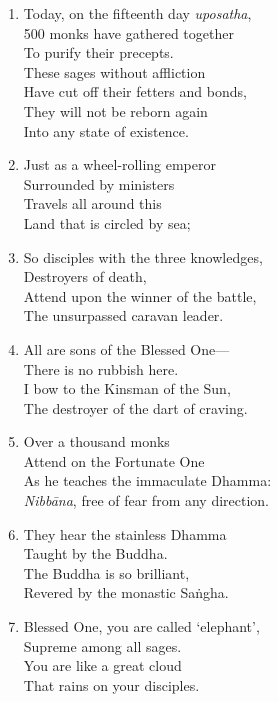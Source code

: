 \documentclass[10pt, openany]{book}
\newcommand*{\vleftofline}[1]{\leavevmode\llap{#1}}
\begin{document}
\begin{enumerate}
\item \vleftofline{“}Today, on the fifteenth day \emph{uposatha},\\
500 monks have gathered together \\
To purify their precepts.\\
These sages without affliction \\
Have cut off their fetters and bonds,\\
They will not be reborn again \\
Into any state of existence.

\item Just as a wheel-rolling emperor\\
Surrounded by ministers\\
Travels all around this\\
Land that is circled by sea;

\item So disciples with the three knowledges,\\
Destroyers of death,\\
Attend upon the winner of the battle,\\
The unsurpassed caravan leader.

\item All are sons of the Blessed One—\\
There is no rubbish here.\\
I bow to the Kinsman of the Sun,\\
The destroyer of the dart of craving.

\item Over a thousand monks\\
Attend on the Fortunate One\\
As he teaches the immaculate Dhamma:\\
\emph{Nibbāna}, free of fear from any direction.

\item They hear the stainless Dhamma\\
Taught by the Buddha.\\
The Buddha is so brilliant,\\
Revered by the monastic Saṅgha.

\item Blessed One, you are called ‘elephant’,\\
Supreme among all sages.\\
You are like a great cloud\\
That rains on your disciples.


\end{enumerate}
\end{document}
